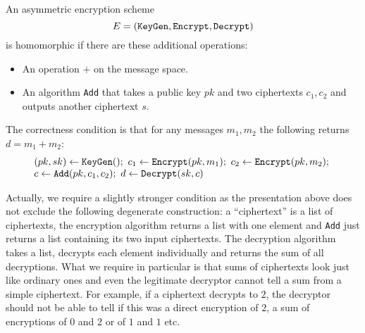 \documentclass[envcountsame]{llncs}
\newcommand{\alg}[1]{\textup{\texttt{#1}}}
\begin{document}
\begin{definition}
An asymmetric encryption scheme
\[ E = \left(\alg{KeyGen}, \alg{Encrypt}, \alg{Decrypt}\right)\]
is homomorphic if there are these additional operations:

\begin{itemize}
\item An operation $+$ on the message space.
\item An algorithm \alg{Add} that takes a public key $pk$ and two ciphertexts
$c_1, c_2$ and outputs another ciphertext $s$.
\end{itemize}

The correctness condition is that for any messages $m_1, m_2$ the following returns $d = m_1 + m_2$:
\[
\begin{array}{l}
(pk, sk) \gets \alg{KeyGen}();\ 
c_1 \gets \alg{Encrypt}(pk, m_1);\ 
c_2 \gets \alg{Encrypt}(pk, m_2);\ \\
c \gets \alg{Add}(pk, c_1, c_2);\ 
d \gets \alg{Decrypt}(sk, c)
\end{array}
\]
\end{definition}

Actually, we require a slightly stronger condition as the presentation above
does not exclude the following degenerate construction: a ``ciphertext'' is a
list of ciphertexts, the encryption algorithm returns a list with one element
and \alg{Add} just returns a list containing its two input ciphertexts. The
decryption algorithm takes a list, decrypts each element individually and
returns the sum of all decryptions. What we require in particular is that sums
of ciphertexts look just like ordinary ones and even the legitimate decryptor
cannot tell a sum from a simple ciphertext. For example, if a ciphertext
decrypts to $2$, the decryptor should not be able to tell if this was a direct
encryption of $2$, a sum of encryptions of $0$ and $2$ or of $1$ and $1$ etc.
\end{document}
